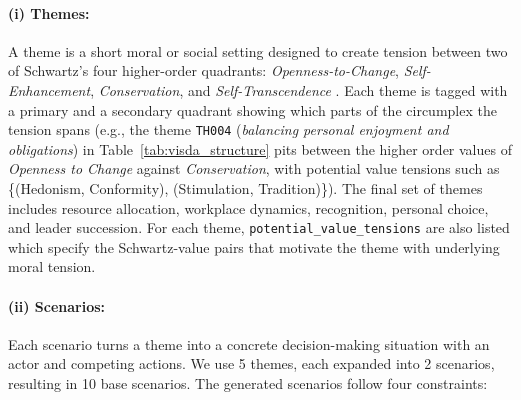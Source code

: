 \documentclass[11pt]{article}
\begin{document}
\paragraph{(i) Themes:} A theme is a short moral or social setting designed to create tension between two of Schwartz's four higher-order quadrants: \emph{Openness-to-Change}, \emph{Self-Enhancement}, \emph{Conservation}, and \emph{Self-Transcendence} \citep{schwartz1992universals}. Each theme is tagged with a primary and a secondary quadrant showing which parts of the circumplex the tension spans (e.g., the theme \texttt{TH004} (\emph{balancing personal enjoyment and obligations}) in Table~\ref{tab:visda_structure} pits between the higher order values of \emph{Openness to Change} against \emph{Conservation}, with potential value tensions such as \{(Hedonism, Conformity), (Stimulation, Tradition)\}). The final set of themes includes resource allocation, workplace dynamics, recognition, personal choice, and leader succession. For each theme, \texttt{potential\_value\_tensions} are also listed which specify the Schwartz-value pairs that motivate the theme with underlying moral tension.



\paragraph{(ii) Scenarios:} Each scenario turns a theme into a concrete decision-making situation with an actor and competing actions. We use 5 themes, each expanded into 2 scenarios, resulting in 10 base scenarios. The generated scenarios follow four constraints:
\end{document}
